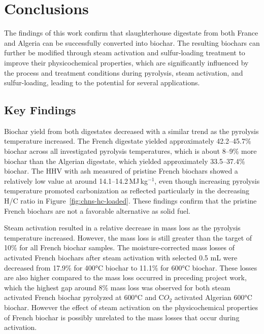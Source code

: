 \newpage
\section{Conclusions}

The findings of this work confirm that slaughterhouse digestate from both France and Algeria can be successfully converted into biochar. The resulting biochars can further be modified through steam activation and sulfur-loading treatment to improve their physicochemical properties, which are significantly influenced by the process and treatment conditions during pyrolysis, steam activation, and sulfur-loading, leading to the potential for several applications.

\subsection{Key Findings}
\label{subsec:key-findings}

Biochar yield from both digestates decreased with a similar trend as the pyrolysis temperature increased. The French digestate yielded approximately 42.2--45.7\% biochar across all investigated pyrolysis temperatures, which is about 8–9\% more biochar than the Algerian digestate, which yielded approximately 33.5--37.4\% biochar. The HHV with ash measured of pristine French biochars showed a relatively low value at around 14.1--14.2\,MJ\,kg$^{-1}$, even though increasing pyrolysis temperature promoted carbonization as reflected particularly in the decreasing H/C ratio in Figure~\ref{fig:chns-hc-loaded}. These findings confirm that the pristine French biochars are not a favorable alternative as solid fuel. 

\vspace{0.3em}

Steam activation resulted in a relative decrease in mass loss as the pyrolysis temperature increased. However, the mass loss is still greater than the target of 10\% for all French biochar samples. The moisture-corrected mass losses of activated French biochars after steam activation with selected 0.5 mL were decreased from 17.9\% for 400°C biochar to 11.1\% for 600°C biochar. These losses are also higher compared to the mass loss occurred in preceding project work, which the highest gap around 8\% mass loss was observed for both steam activated French biochar pyrolyzed at 600°C and C$O_2$ activated Algerian 600°C biochar. However the effect of steam activation on the physicochemical properties of French biochar is possibly unrelated to the mass losses that occur during activation. 

